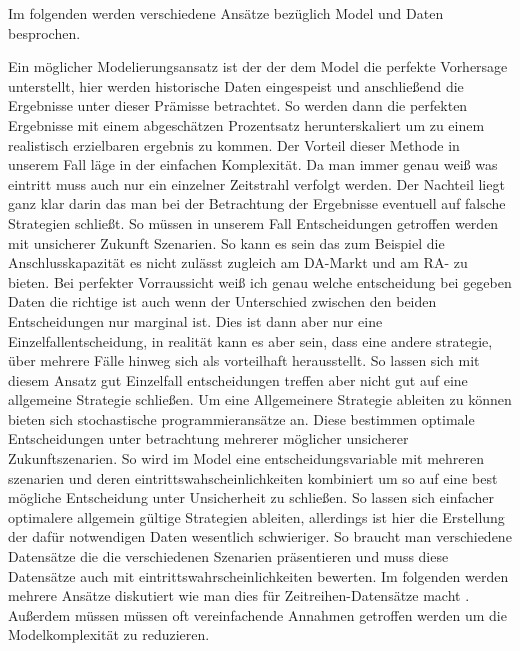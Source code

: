 Im folgenden werden verschiedene Ansätze bezüglich Model und Daten besprochen.

Ein möglicher Modelierungsansatz ist der der dem Model die perfekte Vorhersage unterstellt, hier werden historische
Daten eingespeist und anschließend die Ergebnisse
unter dieser Prämisse betrachtet. So werden dann die perfekten Ergebnisse mit einem abgeschätzen Prozentsatz herunterskaliert um zu einem
realistisch erzielbaren ergebnis zu kommen. Der Vorteil dieser Methode in unserem Fall läge in der einfachen Komplexität. Da man immer
genau weiß was eintritt muss auch nur ein einzelner Zeitstrahl verfolgt werden.
Der Nachteil liegt ganz klar darin das man bei der Betrachtung der Ergebnisse eventuell auf falsche Strategien schließt.
So müssen in  unserem Fall Entscheidungen getroffen werden mit unsicherer Zukunft Szenarien.
So kann es sein das zum Beispiel die Anschlusskapazität es nicht zulässt zugleich am DA-Markt und am RA- zu bieten.
 Bei perfekter Vorraussicht weiß ich genau welche entscheidung bei gegeben Daten die richtige ist auch wenn
der Unterschied zwischen den beiden Entscheidungen nur marginal ist.
Dies ist dann aber nur eine Einzelfallentscheidung, in realität kann es aber sein, dass eine andere strategie, über mehrere Fälle hinweg sich
als vorteilhaft herausstellt.
So lassen sich mit diesem Ansatz gut Einzelfall entscheidungen treffen aber nicht gut auf eine allgemeine Strategie schließen.
Um eine Allgemeinere Strategie ableiten zu können bieten sich stochastische programmieransätze an. Diese bestimmen optimale Entscheidungen
unter betrachtung  mehrerer möglicher unsicherer Zukunftszenarien. So wird im Model eine entscheidungsvariable mit mehreren szenarien und deren
eintrittswahscheinlichkeiten kombiniert um so auf eine best mögliche Entscheidung unter Unsicherheit zu schließen.
So lassen sich einfacher optimalere allgemein gültige Strategien ableiten, allerdings ist hier die Erstellung der dafür notwendigen Daten wesentlich
schwieriger. So braucht man verschiedene Datensätze die die verschiedenen Szenarien präsentieren und muss diese Datensätze auch mit eintrittswahrscheinlichkeiten bewerten.
Im folgenden werden mehrere Ansätze diskutiert wie man dies für Zeitreihen-Datensätze macht .
Außerdem müssen müssen oft vereinfachende Annahmen getroffen werden um die Modelkomplexität zu reduzieren.
